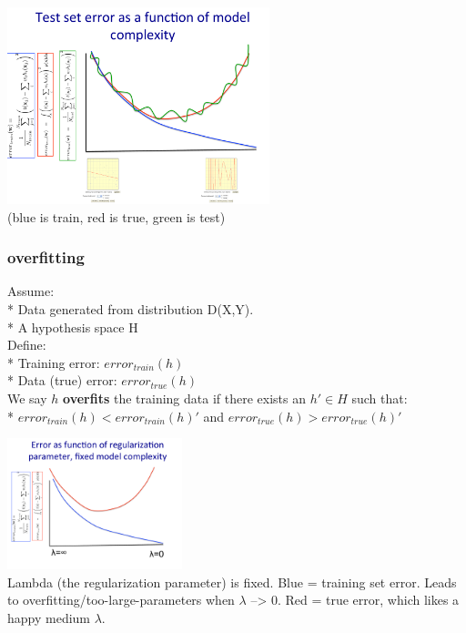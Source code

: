 \includegraphics[width=3in]{figures/errors_as_f_of_complexity.pdf}   \hfill \\
(blue is train, red is true, green is test) \hfill \\

\subsubsection{overfitting}
Assume: \hfill \\
* Data generated from distribution D(X,Y). \hfill \\
* A hypothesis space H \hfill \\
Define:  \hfill \\
* Training error: $error_{train}(h)$ \hfill \\
* Data (true) error: $error_{true}(h)$ \hfill \\
We say $h$ \textbf{overfits} the training data if there exists an $h' \in H$ such that:  \hfill \\ 
* $error_{train}(h) < error_{train}(h)'$ and $error_{true}(h) > error_{true}(h)'$

\includegraphics[width=2in]{figures/Error--vs_lambda--fixed_model_complexity.pdf}   \hfill \\
Lambda (the regularization parameter) is fixed.  Blue = training set error.  
Leads to overfitting/too-large-parameters when $\lambda$ --> 0. 
Red = true error, which likes a happy medium $\lambda$.  \hfill \\  \hfill \\


